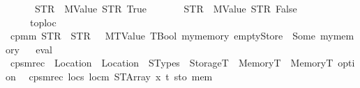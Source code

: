 \begin{isabellebody}
\ \ \ \ \ \ {\isacharbrackleft}{\kern0pt}{\isacharparenleft}{\kern0pt}STR\ {\isacharprime}{\kern0pt}{\isacharprime}{\kern0pt}{}{\isachardot}{\kern0pt}{}{\isacharprime}{\kern0pt}{\isacharprime}{\kern0pt}{\isacharcomma}{\kern0pt}\ MValue\ STR\ {\isacharprime}{\kern0pt}{\isacharprime}{\kern0pt}True{\isacharprime}{\kern0pt}{\isacharprime}{\kern0pt}{\isacharparenright}{\kern0pt}{\isacharcomma}{\kern0pt}\isanewline
\ \ \ \ \ \ \ {\isacharparenleft}{\kern0pt}STR\ {\isacharprime}{\kern0pt}{\isacharprime}{\kern0pt}{}{\isachardot}{\kern0pt}{}{\isacharprime}{\kern0pt}{\isacharprime}{\kern0pt}{\isacharcomma}{\kern0pt}\ MValue\ STR\ {\isacharprime}{\kern0pt}{\isacharprime}{\kern0pt}False{\isacharprime}{\kern0pt}{\isacharprime}{\kern0pt}{\isacharparenright}{\kern0pt}{\isacharbrackright}{\kern0pt}{\isacharcomma}{\kern0pt}\isanewline
\ \ \ \ \ toploc\ {\isacharequal}{\kern0pt}\ {}{\isasymrparr}{\isachardoublequoteclose}\isanewline
\isanewline
{}\isamarkupfalse%
\ {\isachardoublequoteopen}cpm{}m\ {\isacharparenleft}{\kern0pt}STR\ {\isacharprime}{\kern0pt}{\isacharprime}{\kern0pt}{}{\isachardot}{\kern0pt}{}{\isacharprime}{\kern0pt}{\isacharprime}{\kern0pt}{\isacharparenright}{\kern0pt}\ {\isacharparenleft}{\kern0pt}STR\ {\isacharprime}{\kern0pt}{\isacharprime}{\kern0pt}{}{\isacharprime}{\kern0pt}{\isacharprime}{\kern0pt}{\isacharparenright}{\kern0pt}\ {}\ {\isacharparenleft}{\kern0pt}MTValue\ TBool{\isacharparenright}{\kern0pt}\ mymemory\ emptyStore\ {\isacharequal}{\kern0pt}\ Some\ mymemory{}{\isachardoublequoteclose}%
\isadelimproof
\ %
\endisadelimproof
%
\isatagproof
{}\isamarkupfalse%
\ eval%
\endisatagproof
{\isafoldproof}%
%
\isadelimproof
%
\endisadelimproof
%
\isadelimdocument
%
\endisadelimdocument
%
\isatagdocument
%
\isamarkuptrue%
%
\isamarkuptrue%
%
\endisatagdocument
{\isafolddocument}%
%
\isadelimdocument
%
\endisadelimdocument
{}\isamarkupfalse%
\ cps{}mrec\ {\isacharcolon}{\kern0pt}{\isacharcolon}{\kern0pt}\ {\isachardoublequoteopen}Location\ {\isasymRightarrow}\ Location\ {\isasymRightarrow}\ STypes\ {\isasymRightarrow}\ StorageT\ {\isasymRightarrow}\ MemoryT\ {\isasymRightarrow}\ MemoryT\ option{\isachardoublequoteclose}\isanewline
{}\isanewline
\ \ {\isachardoublequoteopen}cps{}mrec\ locs\ locm\ {\isacharparenleft}{\kern0pt}STArray\ x\ t{\isacharparenright}{\kern0pt}\ sto\ mem\ {\isacharequal}{\kern0pt}\isanewline

\end{isabellebody}
